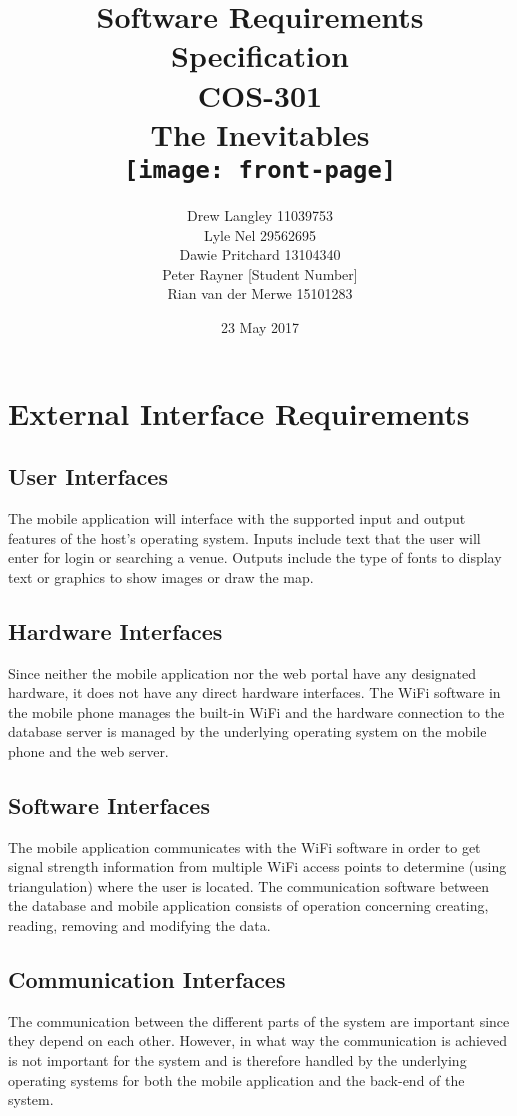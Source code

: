 \documentclass{article}
\title{ Software Requirements Specification \\ COS-301 \\ The Inevitables \\[0.5cm] \texttt{[image: front-page]}}
\author{Drew Langley \hfill 11039753 \\ Lyle Nel \hfill 29562695 \\ Dawie Pritchard \hfill 13104340 \\  Peter Rayner \hfill [Student Number]\\ Rian van der Merwe \hfill 15101283 }
\date{23 May 2017}
\begin{document}
\maketitle
\pagebreak
\tableofcontents
\pagebreak

\section{External Interface Requirements}
    \subsection{User Interfaces}
        The mobile application will interface with the supported input and output
        features of the host's operating system. Inputs include text that the user
        will enter for login or searching a venue. Outputs include the type of fonts
        to display text or graphics to show images or draw the map.

    \subsection{Hardware Interfaces}
        Since neither the mobile application nor the web portal have any designated
        hardware, it does not have any direct hardware interfaces. The WiFi software
        in the mobile phone manages the built-in WiFi and the hardware connection
        to the database server is managed by the underlying operating system on the
        mobile phone and the web server.

    \subsection{Software Interfaces}
        The mobile application communicates with the WiFi software in order to get
        signal strength information from multiple WiFi access points to determine
        (using triangulation) where the user is located. The communication software
        between the database and mobile application consists of operation concerning
        creating, reading, removing and modifying the data.

    \subsection{Communication Interfaces}
        The communication between the different parts of the system are important since they depend on each other. However, in what way the communication is achieved is not important for the system and is therefore handled by the underlying operating systems for both the mobile application and the back-end of the system.
\end{document}
